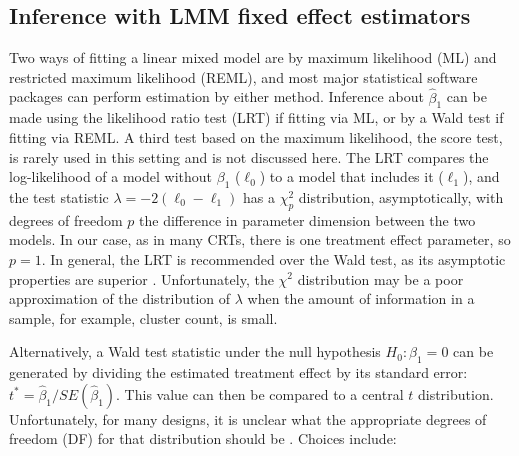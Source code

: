 \documentclass[twocolumn]{bmcart}%
\begin{document}
\subsection*{Inference with LMM fixed effect estimators}

Two ways of fitting a linear mixed model are by maximum likelihood (ML) and restricted maximum likelihood (REML), and most major statistical software packages can perform estimation by either method. Inference about $\hat{\beta}_1$ can be made using the likelihood ratio test (LRT) if fitting via ML, or by a Wald test if fitting via REML. A third test based on the maximum likelihood, the score test, is rarely used in this setting and is not discussed here. The LRT compares the log-likelihood of a model without $\beta_1$ ($\ell_0$) to a model that includes it ($\ell_1$), and the test statistic $\lambda = -2(\ell_0 - \ell_1)$ has a $\chi^2_p$ distribution, asymptotically, with degrees of freedom $p$ the difference in parameter dimension between the two models. In our case, as in many CRTs, there is one treatment effect parameter, so $p=1$. In general, the LRT is recommended over the Wald test, as its asymptotic properties are superior \cite{cox_theoretical_1979}.  Unfortunately, the $\chi^2$ distribution may be a poor approximation of the distribution of $\lambda$ when the amount of information in a sample, for example, cluster count, is small.


Alternatively, a Wald test statistic under the null hypothesis $H_0: \beta_1=0$ can be generated by dividing the estimated treatment effect by its standard error: $t^* =\hat{\beta}_1 / SE(\hat{\beta}_1)$.  This value can then be compared to a central $t$ distribution. Unfortunately, for many designs, it is unclear what the appropriate degrees of freedom (DF) for that distribution should be \cite{bates_fitting_2015}. Choices include:
\end{document}
